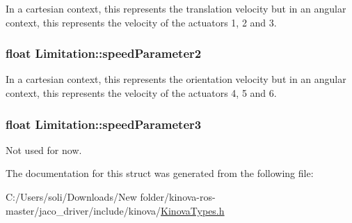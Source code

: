 In a cartesian context, this represents the translation velocity but in an angular context, this represents the velocity of the actuators 1, 2 and 3. 

\subsubsection[{\texorpdfstring{speed\+Parameter2}{speedParameter2}}]{\setlength{\rightskip}{0pt plus 5cm}float Limitation\+::speed\+Parameter2}\hypertarget{struct_limitation_aa17c9688bba54c9a8e2208d38266ae93}{}\label{struct_limitation_aa17c9688bba54c9a8e2208d38266ae93}


In a cartesian context, this represents the orientation velocity but in an angular context, this represents the velocity of the actuators 4, 5 and 6. 

\subsubsection[{\texorpdfstring{speed\+Parameter3}{speedParameter3}}]{\setlength{\rightskip}{0pt plus 5cm}float Limitation\+::speed\+Parameter3}\hypertarget{struct_limitation_a3d2e542a721c712b06b70f554d10d468}{}\label{struct_limitation_a3d2e542a721c712b06b70f554d10d468}
Not used for now. 

The documentation for this struct was generated from the following file\+:\begin{DoxyCompactItemize}
\item 
C\+:/\+Users/soli/\+Downloads/\+New folder/kinova-\/ros-\/master/jaco\+\_\+driver/include/kinova/\hyperlink{_kinova_types_8h}{Kinova\+Types.\+h}\end{DoxyCompactItemize}

